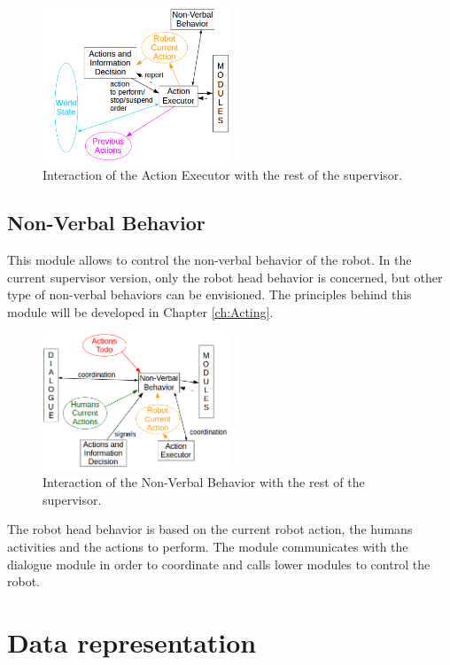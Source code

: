 \documentclass[english,a4paper,11pt,twoside]{StyleThese}
\begin{document}
\begin{figure}[!h]
	\centering
    \includegraphics[width=0.5\textwidth]{figs/Chapter2/ActionExecutor.png}
    \caption{Interaction of the Action Executor with the rest of the supervisor.}
    \label{fig:actionExecutor}
\end{figure}


\subsection{Non-Verbal Behavior}

This module allows to control the non-verbal behavior of the robot. In the current supervisor version, only the robot head behavior is concerned, but other type of non-verbal behaviors can be envisioned. The principles behind this module will be developed in Chapter \ref{ch:Acting}.

\begin{figure}[!h]
	\centering
    \includegraphics[width=0.5\textwidth]{figs/Chapter2/NVBehavior.png}
    \caption{Interaction of the Non-Verbal Behavior with the rest of the supervisor.}
    \label{fig:NVBehavior}
\end{figure}

The robot head behavior is based on the current robot action, the humans activities and the actions to perform. The module communicates with the dialogue module in order to coordinate and calls lower modules to control the robot. 

\section{Data representation}
\end{document}
